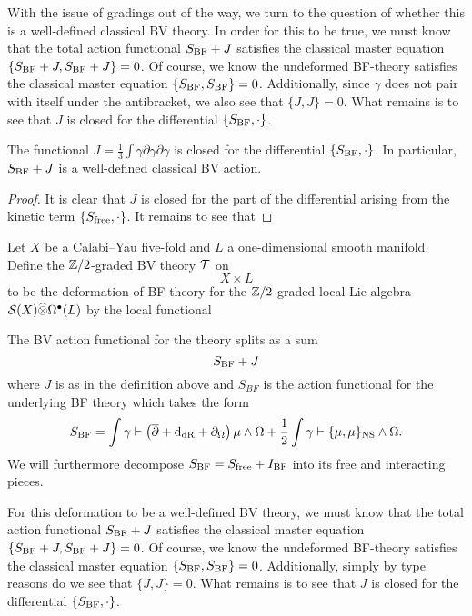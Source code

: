 \documentclass[11pt]{amsart}
\begin{document}
With the issue of gradings out of the way, we turn to the question of whether this is a well-defined classical BV theory.
In order for this to be true, we must know that the total action functional $S_{\rm BF} + J$ satisfies the classical master equation $\{S_{\rm BF} + J , S_{\rm BF} + J\} = 0$.
Of course, we know the undeformed BF-theory satisfies the classical master equation $\{S_{\rm BF}, S_{\rm BF}\} = 0$.
Additionally, since $\gamma$ does not pair with itself under the antibracket, we also see that $\{J,J\}=0$.
What remains is to see that $J$ is closed for the differential $\{S_{\rm BF}, \cdot\}$.

\begin{lem}
The functional $J = \frac13 \int \gamma \partial \gamma \partial \gamma$ is closed for the differential $\{S_{\rm BF},\cdot\}$.
In particular, $S_{\rm BF} + J$ is a well-defined classical BV action.
\end{lem}

\begin{proof}
It is clear that $J$ is closed for the part of the differential arising from the kinetic term $\{S_{\rm free},\cdot\}$.
It remains to see that
\end{proof}

\begin{dfn}
Let $X$ be a Calabi--Yau five-fold and $L$ a one-dimensional smooth manifold.
Define the $\mathbb Z/2$-graded BV theory $\mathcal T$ on
      \[
        X \times L
      \]
to be the deformation of BF theory for the $\mathbb Z/2$-graded local Lie algebra $\mathcal S(X) \widehat{\otimes} \Omega^{\bullet}(L)$ by the local functional

\end{dfn}

The BV action functional for the theory splits as a sum
\[
  S_{\rm BF} + J
\]
where $J$ is as in the definition above and $S_{BF}$ is the action functional for the underlying BF theory which takes the form
\[
  S_{\rm BF} = \int \gamma \vdash \left(\overline{\partial} + {\rm d}_{\rm dR} + \partial_{\Omega}\right) \mu \wedge \Omega + \frac12 \int \gamma \vdash \{\mu,\mu\}_{\rm NS} \wedge \Omega .
\]
We will furthermore decompose $S_{\rm BF} = S_{\rm free}+I_{\rm BF}$ into its free and interacting pieces.

For this deformation to be a well-defined BV theory, we must know that the total action functional $S_{\rm BF} + J$ satisfies the classical master equation $\{S_{\rm BF} + J , S_{\rm BF} + J\} = 0$.
Of course, we know the undeformed BF-theory satisfies the classical master equation $\{S_{\rm BF}, S_{\rm BF}\} = 0$.
Additionally, simply by type reasons do we see that $\{J,J\}=0$.
What remains is to see that $J$ is closed for the differential $\{S_{\rm BF}, \cdot\}$.
\end{document}
